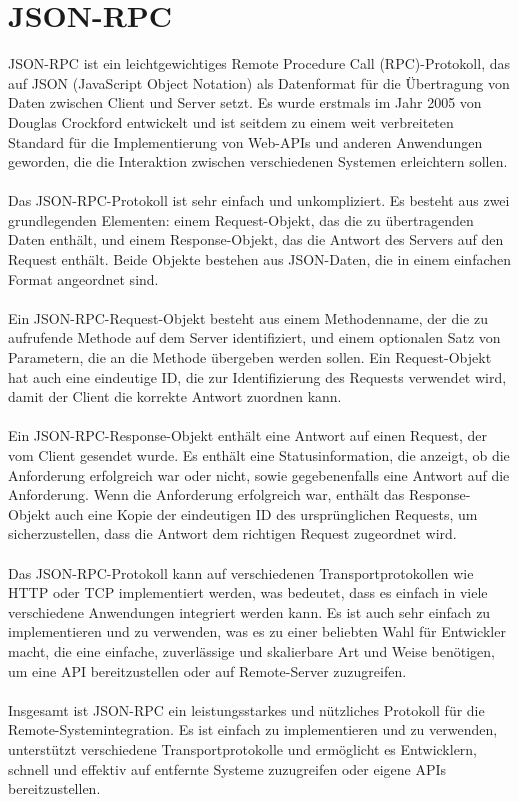 \documentclass[german,oneside,color]{htldipl}
\begin{document}
\section{JSON-RPC}
JSON-RPC ist ein leichtgewichtiges Remote Procedure Call (RPC)-Protokoll, das auf JSON (JavaScript Object Notation) als Datenformat für die Übertragung von Daten zwischen Client und Server setzt. Es wurde erstmals im Jahr 2005 von Douglas Crockford entwickelt und ist seitdem zu einem weit verbreiteten Standard für die Implementierung von Web-APIs und anderen Anwendungen geworden, die die Interaktion zwischen verschiedenen Systemen erleichtern sollen.
\\
\\
Das JSON-RPC-Protokoll ist sehr einfach und unkompliziert. Es besteht aus zwei grundlegenden Elementen: einem Request-Objekt, das die zu übertragenden Daten enthält, und einem Response-Objekt, das die Antwort des Servers auf den Request enthält. Beide Objekte bestehen aus JSON-Daten, die in einem einfachen Format angeordnet sind.
\\
\\
Ein JSON-RPC-Request-Objekt besteht aus einem Methodenname, der die zu aufrufende Methode auf dem Server identifiziert, und einem optionalen Satz von Parametern, die an die Methode übergeben werden sollen. Ein Request-Objekt hat auch eine eindeutige ID, die zur Identifizierung des Requests verwendet wird, damit der Client die korrekte Antwort zuordnen kann.
\\
\\
Ein JSON-RPC-Response-Objekt enthält eine Antwort auf einen Request, der vom Client gesendet wurde. Es enthält eine Statusinformation, die anzeigt, ob die Anforderung erfolgreich war oder nicht, sowie gegebenenfalls eine Antwort auf die Anforderung. Wenn die Anforderung erfolgreich war, enthält das Response-Objekt auch eine Kopie der eindeutigen ID des ursprünglichen Requests, um sicherzustellen, dass die Antwort dem richtigen Request zugeordnet wird.
\\
\\
Das JSON-RPC-Protokoll kann auf verschiedenen Transportprotokollen wie HTTP oder TCP implementiert werden, was bedeutet, dass es einfach in viele verschiedene Anwendungen integriert werden kann. Es ist auch sehr einfach zu implementieren und zu verwenden, was es zu einer beliebten Wahl für Entwickler macht, die eine einfache, zuverlässige und skalierbare Art und Weise benötigen, um eine API bereitzustellen oder auf Remote-Server zuzugreifen.
\\
\\
Insgesamt ist JSON-RPC ein leistungsstarkes und nützliches Protokoll für die Remote-Systemintegration. Es ist einfach zu implementieren und zu verwenden, unterstützt verschiedene Transportprotokolle und ermöglicht es Entwicklern, schnell und effektiv auf entfernte Systeme zuzugreifen oder eigene APIs bereitzustellen.
\end{document}
